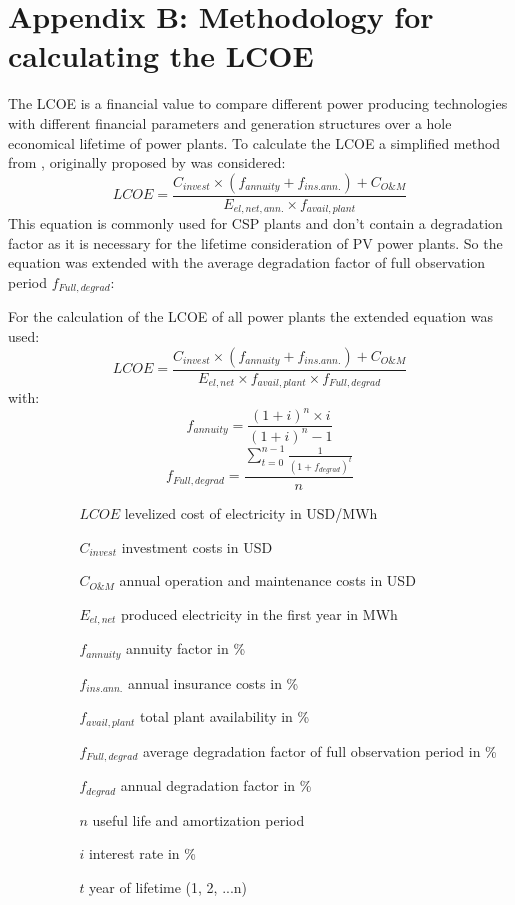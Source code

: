 \chapter{Appendix B: Methodology for calculating the LCOE} \label{ChapterLCOE}
The LCOE is a financial value to compare different power producing technologies with different financial parameters and generation structures over a hole economical lifetime of power plants. To calculate the LCOE a simplified method from \cite{Morin2012}, originally proposed by \cite{Roy1997} was considered:
\begin{equation}
LCOE=\frac{C_{invest}\times(f_{annuity}+f_{ins.ann.})+C_{O\&M}}{E_{el,net,ann.}\times f_{avail,plant}} \label{eq:LCOEold}
\end{equation}
This equation is commonly used for CSP plants and don't contain a degradation factor as it is necessary for the lifetime consideration of PV power plants. So the equation was extended with the average degradation factor of full observation period $f_{Full,degrad}$:

For the calculation of the LCOE of all power plants the extended equation was used:
\begin{equation}
LCOE=\frac{C_{invest}\times(f_{annuity}+f_{ins.ann.})+C_{O\&M}}{E_{el,net}\times f_{avail,plant} \times f_{Full,degrad}}\label{eq:LCOE}
\end{equation}
with:
\begin{equation}
f_{annuity} = \frac{(1+i)^n \times i}{(1+i)^n-1} \label{annuity}
\end{equation}
\begin{equation}
f_{Full,degrad} = \frac{\sum\limits_{t=0}^{n-1} \frac{1}{(1+f_{degrad})^{t}}}{n} \label{GL_Degradationfactor}
\end{equation} 
\begin{itemize}
\item[ ] 
\begin{itemize}
\item[ ] 
\begin{itemize}
\item[$LCOE$]levelized cost of electricity in USD/MWh
\item[$C_{invest}$]investment costs in USD
\item[$C_{O\&M}$]annual operation and maintenance costs in USD
\item[$E_{el,net}$]produced electricity in the first year in MWh
\item[$f_{annuity}$]annuity factor in \%
\item[$f_{ins.ann.}$]annual insurance costs in \%
\item[$f_{avail,plant}$]total plant availability in \%
\item[$f_{Full,degrad}$]average degradation factor of full observation period in \%
\item[$f_{degrad}$]annual degradation factor in \%
\item[$n$]useful life and amortization period
\item[$i$]interest rate in \%
\item[$t$]year of lifetime (1, 2, ...n)
\end{itemize}
\end{itemize}
\end{itemize}
\pagebreak
